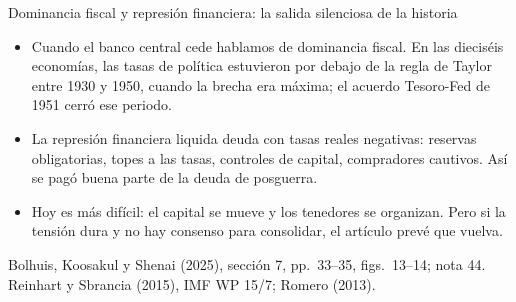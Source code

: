 \documentclass[aspectratio=169,11pt]{beamer}
\newcommand{\fuente}[1]{\par\vfill{\small\color{cGris}#1\par}}
\newcommand{\BKS}{Bolhuis, Koosakul y Shenai (2025)}
\begin{document}
\begin{frame}{Dominancia fiscal y represión financiera: la salida silenciosa de la historia}
  \begin{itemize}
    \item<1-> Cuando el banco central cede hablamos de dominancia fiscal. En las dieciséis economías, las tasas de política estuvieron por debajo de la regla de Taylor entre 1930 y 1950, cuando la brecha era máxima; el acuerdo Tesoro-Fed de 1951 cerró ese periodo.
    \item<2-> La represión financiera liquida deuda con tasas reales negativas: reservas obligatorias, topes a las tasas, controles de capital, compradores cautivos. Así se pagó buena parte de la deuda de posguerra.
    \item<3-> Hoy es más difícil: el capital se mueve y los tenedores se organizan. Pero si la tensión dura y no hay consenso para consolidar, el artículo prevé que vuelva.
  \end{itemize}
  \fuente{\BKS, sección 7, pp.~33--35, figs.~13--14; nota 44. Reinhart y Sbrancia (2015), IMF WP 15/7; Romero (2013).}
\end{frame}
\end{document}
